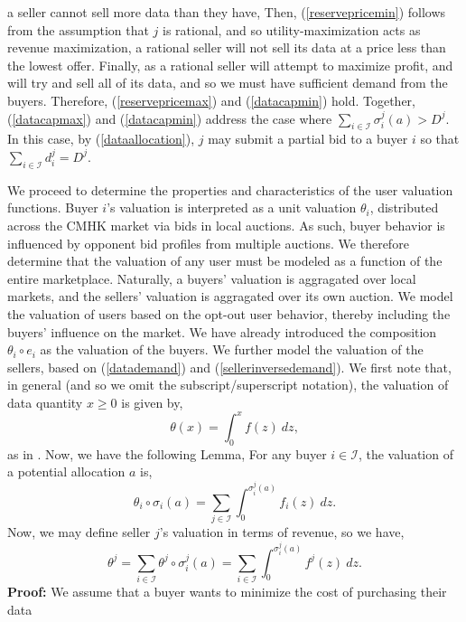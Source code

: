 \documentclass[12pt]{article}
\theoremstyle{definition}
\newcommand{\mcI}{\mathcal{I}}
\newcommand{\g}{\sigma}
\begin{document}
\begin{multicols}{2}
a seller cannot sell more data than they have,
Then, (\ref{reservepricemin})
follows from the assumption that $j$ is rational, and so utility-maximization
acts as revenue maximization, a rational seller will not sell its
data at a price less than the lowest offer. Finally, as a rational seller will
attempt to maximize profit, and will try and sell all of its data, and so we
must have sufficient demand
from the buyers. Therefore, (\ref{reservepricemax}) and (\ref{datacapmin}) hold. Together, (\ref{datacapmax}) and
(\ref{datacapmin}) address the case where $\sum_{i\in\mcI} \g_i^j(a) >  D^j$. In
this case, by (\ref{dataallocation}), $j$ may submit a partial bid to a buyer
$i$ so that $\sum_{i\in\mcI} d^j_i = D^j$.

We proceed to determine the properties and characteristics of the user valuation functions. Buyer $i$'s valuation is interpreted as a unit valuation $\theta_i$,
distributed across the CMHK market via bids in local auctions. 
As such, buyer behavior is influenced by opponent bid profiles from multiple auctions.
We therefore determine that the valuation of any user must be modeled as a function of the entire
marketplace. Naturally, a buyers' valuation is aggragated over local markets, and the
sellers' valuation is aggragated over its own auction. We model the valuation of
users based on the opt-out user behavior, thereby including the buyers'
influence on the market. We have already introduced the composition $\theta_i
\circ e_i$ as the valuation of the buyers. We further model the valuation of the sellers, based on
(\ref{datademand}) and (\ref{sellerinversedemand}). We first note that, in
general (and so we omit the subscript/superscript notation), the valuation of data quantity $x\ge 0$ is given by,
$$
    \theta(x) = \int_0^x f(z) \ dz,
$$ 
as in \cite{semret}. Now, we have the following Lemma,
{
\label{uservaluation}
For any buyer $i\in\mcI$, the valuation of a potential
allocation $a$ is, 
\begin{equation}\label{buyervaluation}
    \theta_i \circ \g_i(a) = \displaystyle\sum_{j\in\mcI}
 \int_0^{\g_i^j(a)} f_i(z) \ dz.
\end{equation}
Now, we may define seller $j$'s valuation in terms of revenue, so we have,
\begin{equation}\label{sellervaluation}
    \theta^j= \displaystyle\sum_{i\in\mcI} \theta^j \circ \g_i^j(a) = \sum_{i\in\mcI}
 \int_0^{\g_i^j(a)} f^j(z) \ dz.
\end{equation}
}
\textbf{Proof:} 
We assume that a buyer wants to minimize the cost of purchasing their data

\end{multicols}
\end{document}
